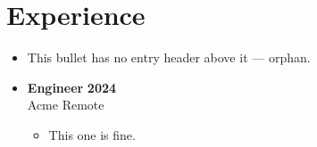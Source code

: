 \documentclass[letterpaper,10pt]{article}
\newcommand{\resumeItem}[1]{\item #1}
\newcommand{\resumeSubheading}[4]{\item \textbf{#1} \hfill \textbf{#2}\\ #3 \hfill #4}
\begin{document}
\section{Experience}
\begin{itemize}
  \resumeItem{This bullet has no entry header above it — orphan.}
  \resumeSubheading{Engineer}{2024}{Acme}{Remote}
    \begin{itemize}
      \resumeItem{This one is fine.}
    \end{itemize}
\end{itemize}
\end{document}

